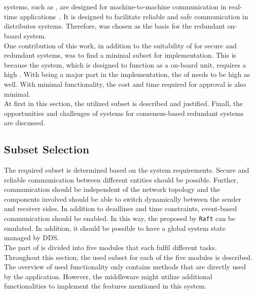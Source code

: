 \section{}

 systems, such as , are designed for machine-to-machine communication in real-time applications~\cite{omgDDSspec}.
It is designed to facilitate reliable and safe communication in distributes systems.
Therefore,  was chosen as the basis for the redundant on-board system.
\\

One contribution of this work, in addition to the suitability of  for secure and redundant systems, was to find a minimal subset for implementation.
This is because the system, which is designed to function as a  on-board unit, requires a high .
With  being a major part in the implementation, the  of  needs to be high as well.
With minimal functionality, the cost and time required for approval is also minimal.
\\

At first in this section, the utilized  subset is described and justified.
Finall, the opportunities and challenges of  systems for consensus-based redundant systems are discussed.

\subsection{Subset Selection}

The required subset is determined based on the system requirements.
Secure and reliable communication between different entities should be possible.
Further, communication should be independent of the network topology and the components involved should be able to switch dynamically between the sender and receiver sides.
In addition to deadlines and time constraints, event-based communication should be enabled.
In this way, the  proposed by \texttt{Raft} can be emulated.
In addition, it should be possible to have a global system state managed by DDS.
\\

The  part of  is divided into five modules that each fulfil different tasks.
Throughout this section, the used subset for each of the five modules is described.
\\

The overview of used functionality only contains methods that are directly used by the application.
However, the middleware might utilize additional functionalities to implement the features mentioned in this system.

